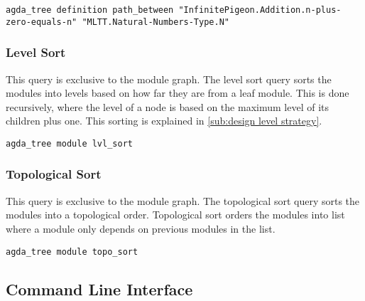 \begin{lstlisting}
agda_tree definition path_between "InfinitePigeon.Addition.n-plus-zero-equals-n" "MLTT.Natural-Numbers-Type.N"
\end{lstlisting}

\subsubsection{Level Sort}

This query is exclusive to the module graph. The level sort query sorts the
modules into levels based on how far they are from a leaf module. This is done
recursively, where the level of a node is based on the maximum level of its
children plus one. This sorting is explained in \cref{sub:design level strategy}.

\begin{lstlisting}
agda_tree module lvl_sort
\end{lstlisting}

\subsubsection{Topological Sort}

This query is exclusive to the module graph. The topological sort query sorts
the modules into a topological order. Topological sort orders the modules into
list where a module only depends on previous modules in the list.


\begin{lstlisting}
agda_tree module topo_sort
\end{lstlisting}


\subsection{Command Line Interface}\label{sub:Agda Tree CLI}

